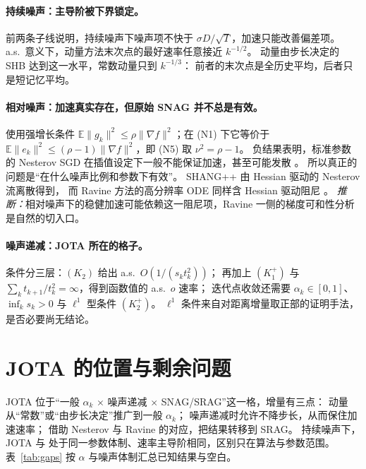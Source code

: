 \documentclass[11pt]{ctexart}
\newcommand{\E}{\mathbb{E}}
\begin{document}
\paragraph{持续噪声：主导阶被下界锁定。}
前两条子线说明，持续噪声下噪声项不快于 $\sigma D/\sqrt T$，加速只能改善偏差项。
a.s.\ 意义下，动量方法末次点的最好速率任意接近 $k^{-1/2}$。
动量由步长决定的 SHB 达到这一水平，常数动量只到 $k^{-1/3}$：
前者的末次点是全历史平均，后者只是短记忆平均。

\paragraph{相对噪声：加速真实存在，但原始 SNAG 并不总是有效。}
\citet{vaswani2019fast} 使用强增长条件 $\E\|g_k\|^2\le\rho\|\nabla f\|^2$；在 (N1) 下它等价于
$\E\|e_k\|^2\le(\rho-1)\|\nabla f\|^2$，即 (N5) 取 $\nu^2=\rho-1$。
负结果表明，标准参数的 Nesterov SGD 在插值设定下一般不能保证加速，甚至可能发散
\citep{kidambi2018insufficiency,liu2020accelerating}。
所以真正的问题是“在什么噪声比例和参数下有效”。
SHANG++ \citep{yu2026shang} 由 Hessian 驱动的 Nesterov 流离散得到，
而 Ravine 方法的高分辨率 ODE 同样含 Hessian 驱动阻尼 \citep{attouch2026ravine}。
\emph{推断：}相对噪声下的稳健加速可能依赖这一阻尼项，Ravine 一侧的梯度可和性分析是自然的切入口。

\paragraph{噪声递减：JOTA 所在的格子。}
条件分三层：$(K_2)$ 给出 a.s.\ $O(1/(s_kt_k^2))$；
再加上 $(K_1^+)$ 与 $\sum_k t_{k+1}/t_k^2=\infty$，得到函数值的 a.s.\ $o$ 速率；
迭代点收敛还需要 $\alpha_k\in[0,1]$、$\inf_k s_k>0$ 与 $\ell^1$ 型条件 $(K_2^+)$。
$\ell^1$ 条件来自对距离增量取正部的证明手法，是否必要尚无结论。

\section{JOTA 的位置与剩余问题}

JOTA 位于“一般 $\alpha_k$ $\times$ 噪声递减 $\times$ SNAG/SRAG”这一格，增量有三点：
动量从“常数”或“由步长决定”推广到一般 $\alpha_k$；
噪声递减时允许不降步长，从而保住加速速率；
借助 Nesterov 与 Ravine 的对应，把结果转移到 SRAG。
持续噪声下，JOTA 与 \citet{sebbouh2021} 处于同一参数体制、速率主导阶相同，区别只在算法与参数范围。
表~\ref{tab:gaps} 按 $\alpha$ 与噪声体制汇总已知结果与空白。
\end{document}
